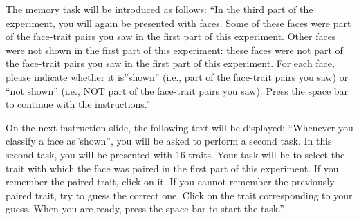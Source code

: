 \documentclass[
  doc,floatsintext]{apa6}
\begin{document}
The memory task will be introduced as follows:
``In the third part of the experiment, you will again be presented with faces.
Some of these faces were part of the face-trait pairs you saw in the first part of this experiment.
Other faces were not shown in the first part of this experiment: these faces were not part of the face-trait pairs you saw in the first part of this experiment.
For each face, please indicate whether it is''shown'' (i.e., part of the face-trait pairs you saw) or
``not shown'' (i.e., NOT part of the face-trait pairs you saw).
Press the space bar to continue with the instructions.''

On the next instruction slide, the following text will be displayed:
``Whenever you classify a face as''shown'', you will be asked to perform a second task.
In this second task, you will be presented with 16 traits.
Your task will be to select the trait with which the face was paired in the first part of this experiment.
If you remember the paired trait, click on it.
If you cannot remember the previously paired trait, try to guess the correct one.
Click on the trait corresponding to your guess.
When you are ready, press the space bar to start the task.''
\end{document}
